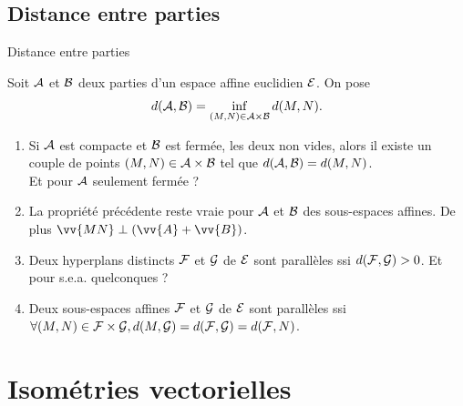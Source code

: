 \documentclass[bigger]{m53beamer}
\begin{document}
\subsection{Distance entre parties}
\begin{frame}{Distance entre parties}
  \begin{definition}
    Soit $\mathcal{A}$ et $\mathcal{B}$ deux parties d'un espace affine euclidien $\mathcal{E}$.
    On pose\forsimple{\vspace*{-.7\baselineskip}}
    \[
      d(\mathcal{A},\mathcal{B}) = \inf_{(M,N) \in \mathcal{A}\times\mathcal{B}}d(M,N).
    \]\forsimple{\vspace*{-.7\baselineskip}}
  \end{definition}
  \begin{enumerate}[<+(1)->]
    \item Si $\mathcal{A}$ est compacte et $\mathcal{B}$ est fermée, les deux non vides, alors il existe un couple de points $(M,N) \in \mathcal{A}\times\mathcal{B}$ tel que $d(\mathcal{A},\mathcal{B}) = d(M,N)$.\pause\\ Et pour $\mathcal{A}$ seulement fermée ?
    \item La propriété précédente reste vraie pour $\mathcal{A}$ et $\mathcal{B}$ des sous-espaces affines. De plus $\vv{MN}\perp(\vv{A}+\vv{B})$.
    \item Deux hyperplans distincts $\mathcal{F}$ et $\mathcal{G}$ de $\mathcal{E}$ sont parallèles ssi $d(\mathcal{F},\mathcal{G}) > 0$. \pause Et pour s.e.a. quelconques ?
    \item Deux sous-espaces affines $\mathcal{F}$ et $\mathcal{G}$ de $\mathcal{E}$ sont parallèles ssi $\forall (M,N) \in \mathcal{F}\times\mathcal{G}, d(M,\mathcal{G})=d(\mathcal{F},\mathcal{G})=d(\mathcal{F},N)$.
  \end{enumerate}
\end{frame}


\section{Isométries vectorielles}

\end{document}
